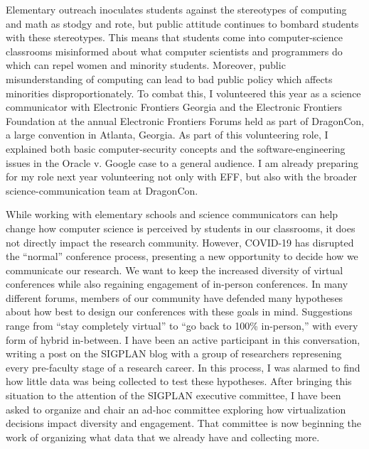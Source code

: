 \documentclass{article}
\theoremstyle{definition}
\begin{document}
Elementary outreach inoculates students against the stereotypes of computing and math as stodgy and rote, but public attitude continues to bombard students with these stereotypes.
This means that students come into computer-science classrooms misinformed about what computer scientists and programmers do which can repel women and minority students.
Moreover, public misunderstanding of computing can lead to bad public policy which affects minorities disproportionately.
To combat this, I volunteered this year as a science communicator with Electronic Frontiers Georgia and the Electronic Frontiers Foundation at the annual Electronic Frontiers Forums held as part of DragonCon, a large convention in Atlanta, Georgia.
As part of this volunteering role, I explained both basic computer-security concepts and the software-engineering issues in the Oracle v. Google case to a general audience.
I am already preparing for my role next year volunteering not only with EFF, but also with the broader science-communication team at DragonCon.

While working with elementary schools and science communicators can help change how computer science is perceived by students in our classrooms, it does not directly impact the research community.
However, COVID-19 has disrupted the ``normal'' conference process, presenting a new opportunity to decide how we communicate our research.
We want to keep the increased diversity of virtual conferences while also regaining engagement of in-person conferences.
In many different forums, members of our community have defended many hypotheses about how best to design our conferences with these goals in mind.
Suggestions range from ``stay completely virtual'' to ``go back to 100\% in-person,'' with every form of hybrid in-between.
I have been an active participant in this conversation, writing a post on the SIGPLAN blog with a group of researchers represening every pre-faculty stage of a research career.
In this process, I was alarmed to find how little data was being collected to test these hypotheses.
After bringing this situation to the attention of the SIGPLAN executive committee, I have been asked to organize and chair an ad-hoc committee exploring how virtualization decisions impact diversity and engagement.
That committee is now beginning the work of organizing what data that we already have and collecting more.
\end{document}
